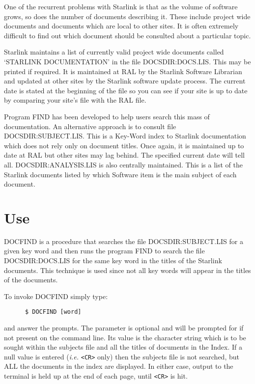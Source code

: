 One of the recurrent problems with Starlink is that as the volume of software
grows, so does the number of documents describing it. These include project
wide documents and documents which are local to other sites. It is often
extremely difficult to find out which document should be consulted about a
particular topic.

Starlink maintains a list of currently valid project wide documents called
`STARLINK DOCUMENTATION' in the file DOCSDIR:DOCS.LIS. This may be printed if
required. It is maintained at RAL by the Starlink Software Librarian and
updated at other sites by the Starlink software update process. The current
date is stated at the beginning of the file so you can see if your site is up
to date by comparing your site's file with the RAL file.

Program FIND has been developed to help users search this mass of
documentation. An alternative approach is to consult file DOCSDIR:SUBJECT.LIS.
This is a Key-Word index to Starlink documentation which does not rely only on
document titles. Once again, it is maintained up to date at RAL but other sites
may lag behind. The specified current date will tell all. DOCSDIR:ANALYSIS.LIS
is also centrally maintained. This is a list of the Starlink documents listed
by which Software item is the main subject of each document.

\section{Use}

DOCFIND is a procedure that searches the file DOCSDIR:SUBJECT.LIS for a given
key word and then runs the program FIND to search the file DOCSDIR:DOCS.LIS for
the same key word in the titles of the Starlink documents. This technique is
used since not all key words will appear in the titles of the documents.

To invoke DOCFIND simply type:
\begin{verbatim}
      $ DOCFIND [word]
\end{verbatim}
and answer the prompts. The parameter is optional and will be prompted for if
not present on the command line. Its value is the character string which is to
be sought within the subjects file and all the titles of documents in the
Index. If a null value is entered ({\it i.e.} \verb+<CR>+ only) then the
subjects file is not searched, but ALL the documents in the index are 
displayed. In either case, output to the terminal is held up at the end of 
each page, until \verb+<CR>+ is hit.

